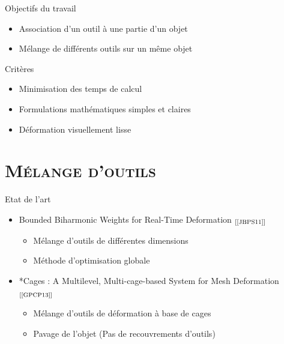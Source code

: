 \documentclass[xcolor=x11names,compress]{beamer}
\renewcommand{\(}{\begin{columns}} \renewcommand{\)}{\end{columns}}
\newcommand{\<}[1]{\begin{column}{#1}} \renewcommand{\>}{\end{column}}
\begin{document}
\begin{frame}{Objectifs du travail}
\begin{itemize}
\item Association d'un outil à une partie d'un objet
\item Mélange de différents outils sur un même objet
\end{itemize}
\begin{block}{Critères}
  \begin{itemize}
    \item Minimisation des temps de calcul
    \item Formulations mathématiques simples et claires
    \item Déformation visuellement lisse
  \end{itemize}
\end{block}
\end{frame}


\section{\scshape Mélange d'outils}

\begin{frame}{Etat de l'art}
\begin{itemize}
  \item Bounded Biharmonic Weights for Real-Time Deformation
  $_{[\text{\cite{JBPS11}}]}$
  \begin{itemize}
    \item Mélange d'outils de différentes dimensions
    \item Méthode d'optimisation globale
  \end{itemize}
  \item *Cages : A Multilevel, Multi-cage-based System for Mesh Deformation 
  $_{[\text{\cite{GPCP13}}]}$
  \begin{itemize}
    \item Mélange d'outils de déformation à base de cages
    \item Pavage de l'objet (Pas de recouvrements d'outils)
  \end{itemize}
\end{itemize}
\end{frame}
\end{document}
